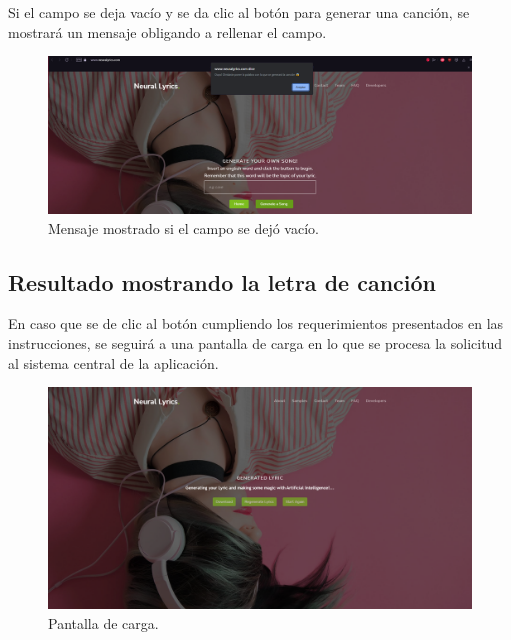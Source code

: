 \documentclass[12pt, a4paper, titlepage]{article}
\begin{document}
	Si el campo se deja vacío y se da clic al botón para generar una canción, se mostrará un mensaje obligando a rellenar el campo.
	
	\begin{figure}[H] 
		\includegraphics[width=13.5cm]{./Imagenes/Capturas/Noword.png}
		\centering \caption{Mensaje mostrado si el campo se dejó vacío.}
	\end{figure}
	\subsection{Resultado mostrando la letra de canción}
	En caso que se de clic al botón cumpliendo los requerimientos presentados en las instrucciones, se seguirá a una pantalla de carga en lo que se procesa la solicitud al sistema central de la aplicación.
	
	\begin{figure}[H] 
		\includegraphics[width=13.5cm]{./Imagenes/Capturas/pgenerating.png}
		\centering \caption{Pantalla de carga.}
	\end{figure}
	
\end{document}
